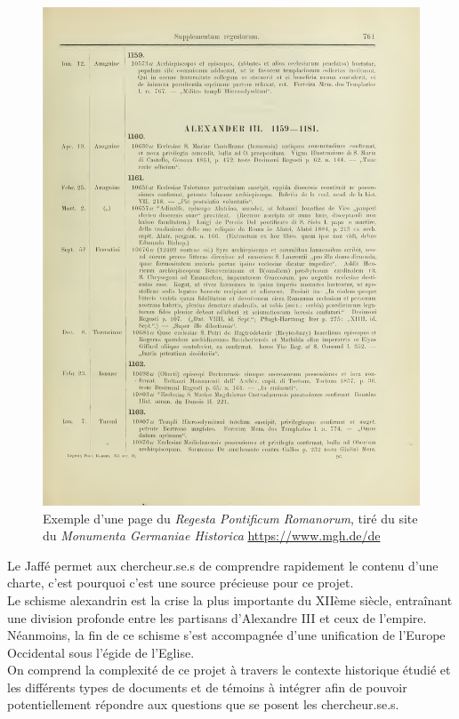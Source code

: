 \begin{figure}[H]
    \centering
    \includegraphics[width=12cm]{images/jaffe2_00772.jpg}
    \caption{Exemple d'une page du \textit{Regesta Pontificum Romanorum}, tiré du site du \textit{Monumenta Germaniae Historica} \url{https://www.mgh.de/de}}
    \label{fig:Jaffe2}
\end{figure}

Le Jaffé permet aux chercheur.se.s de comprendre rapidement le contenu d'une charte, c'est pourquoi c'est une source précieuse pour ce projet.\\

Le schisme alexandrin est la crise la plus importante du XIIème siècle, entraînant une division profonde entre les partisans d'Alexandre III et ceux de l'empire. Néanmoins, la fin de ce schisme s'est accompagnée d'une unification de l'Europe Occidental sous l'égide de l'Eglise.\\ 
On comprend la complexité de ce projet à travers le contexte historique étudié et les différents types de documents et de témoins à intégrer afin de pouvoir potentiellement répondre aux questions que se posent les chercheur.se.s. 